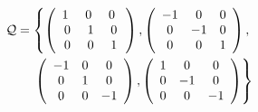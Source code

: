 \documentclass[conference,letterpaper]{IEEEtran}
\begin{document}

\begin{equation}\label{equ19}
\begin{split}
{\cal Q} = \left\{ \left(\begin{array}{ccc}
1\,\, & 0 \,\, & 0 \,\, \\
0 & 1 & 0\\
0 & 0 & 1 \end{array}\right) , \left(\begin{array}{ccc}
-1 & 0 & 0 \\
0 & -1 & 0\\
0 & 0 & 1 \end{array}\right), \right.\\
\left. \left(\begin{array}{ccc}
-1 & 0 & 0 \\
0 & 1 & 0\\
0 & 0 & -1 \end{array}\right), \left(\begin{array}{ccc}
1 & 0 & 0 \\
0 & -1 & 0\\
0 & 0 & -1 \end{array}\right)\right\}
\end{split} 
\end{equation}
\end{document}
